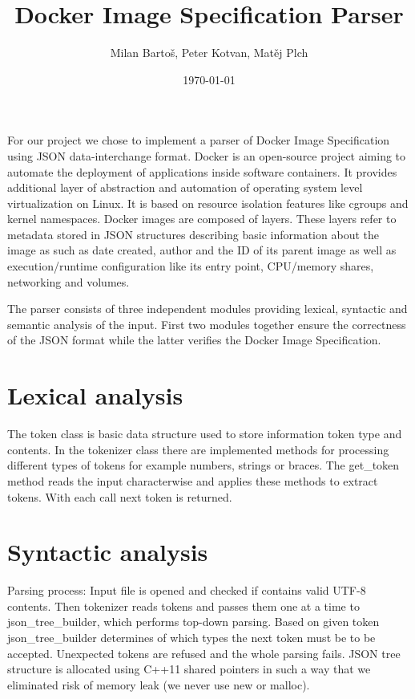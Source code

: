 \documentclass[paper=a4, fontsize=11pt, abstract=on]{scrartcl} %
\title{
\normalfont \normalsize
\LARGE Docker Image Specification Parser \\
}
\author{\normalsize Milan Bartoš, Peter Kotvan, Matěj Plch} %
\date{\normalsize\today} %
\numberwithin{equation}{section} %
\numberwithin{figure}{section} %
\numberwithin{table}{section} %
\begin{document}
\maketitle %

For our project we chose to implement a parser of Docker Image Specification
using JSON data-interchange format. Docker is an open-source project aiming to
automate the deployment of applications inside software containers. It provides
additional layer of abstraction and automation of operating system level
virtualization on Linux. It is based on resource isolation features like cgroups
and kernel namespaces. Docker images are composed of layers. These layers refer
to metadata stored in JSON structures describing basic information about the
image as such as date created, author and the ID of its parent image as well as
execution/runtime configuration like its entry point, CPU/memory shares,
networking and volumes.

The parser consists of three independent modules providing lexical, syntactic
and semantic analysis of the input. First two modules together ensure the
correctness of the JSON format while the latter verifies the Docker Image
Specification.

\section{Lexical analysis}

The token class is basic data structure used to store information token type and
contents. In the tokenizer class there are implemented methods for processing
different types of tokens for example numbers, strings or braces. The get\_token
method reads the input characterwise and applies these methods to extract
tokens. With each call next token is returned.

\section{Syntactic analysis}
Parsing process: Input file is opened and checked if contains valid UTF-8 contents. 
Then tokenizer reads tokens and passes them one at a time to json\_tree\_builder, 
which performs top-down parsing. Based on given token json\_tree\_builder determines 
of which types the next token must be to be accepted. Unexpected tokens are refused 
and the whole parsing fails. JSON tree structure is allocated using C++11 shared pointers
in such a way that we eliminated risk of memory leak (we never use new or malloc).
\end{document}
